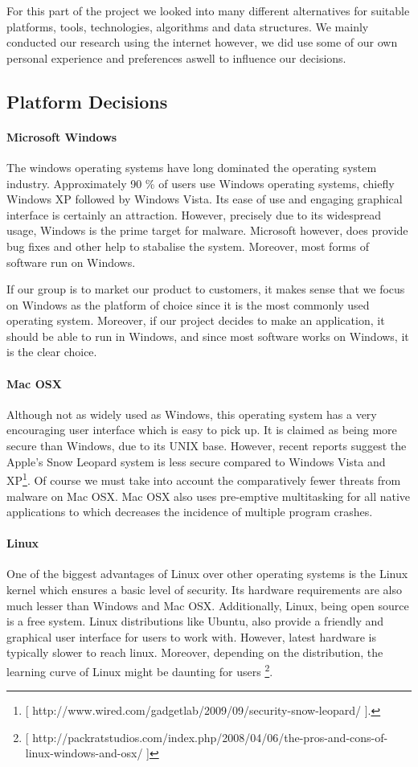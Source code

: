 
For this part of the project we looked into many different alternatives for suitable platforms,
tools, technologies, algorithms and data structures. We mainly conducted our research using the internet however, 
we did use some of our own personal experience and preferences aswell to influence our decisions.

\subsection{Platform Decisions}

\paragraph{Microsoft Windows}
The windows operating systems have long dominated the operating system industry. Approximately 90 \% of users use Windows operating systems, chiefly Windows XP followed by Windows Vista. Its ease of use and engaging graphical interface is certainly an attraction. However, precisely due to its widespread usage, Windows is the prime target for malware. Microsoft however, does provide bug fixes and other help to stabalise the system. Moreover, most forms of software run on Windows.

If our group is to market our product to customers, it makes sense that we focus on Windows as the platform of choice since it is the most commonly used operating system. Moreover, if our project decides to make an application, it should be able to run in Windows, and since most software works on Windows, it is the clear choice.

\paragraph{Mac OSX}
Although not as widely used as Windows, this operating system has a very encouraging user interface which is easy to pick up. It is claimed as being more secure than Windows, due to its UNIX base. However, recent reports suggest the Apple’s Snow Leopard system is less secure compared to Windows Vista and XP\footnote{ [ http://www.wired.com/gadgetlab/2009/09/security-snow-leopard/ ].}. Of course we must take into account the comparatively fewer threats from malware on Mac OSX. 
Mac OSX also uses pre-emptive multitasking for all native applications to which decreases the incidence of multiple program crashes.

\paragraph{Linux}
One of the biggest advantages of Linux over other operating systems is the Linux kernel which ensures a basic level of security. Its hardware requirements are also much lesser than Windows and Mac OSX. Additionally, Linux, being open source is a free system. Linux distributions like Ubuntu, also provide a friendly and graphical user interface for users to work with. However, latest hardware is typically slower to reach linux. Moreover, depending on the distribution, the learning curve of Linux might be daunting for users \footnote{[ http://packratstudios.com/index.php/2008/04/06/the-pros-and-cons-of-linux-windows-and-osx/ ]}.

